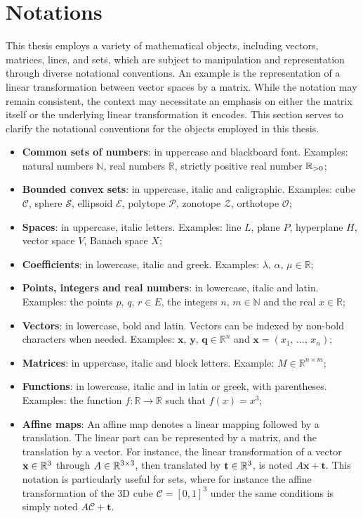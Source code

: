 \section*{Notations}
This thesis employs a variety of mathematical objects, including vectors, matrices, lines, and sets, which are subject to manipulation and representation through diverse notational conventions. An example is the representation of a linear transformation between vector spaces by a matrix. While the notation may remain consistent, the context may necessitate an emphasis on either the matrix itself or the underlying linear transformation it encodes. This section serves to clarify the notational conventions for the objects employed in this thesis.

\begin{itemize}
    \item {\textbf{Common sets of numbers}: in uppercase and blackboard font. Examples: natural numbers $\mathbb{N}$, real numbers $\mathbb{R}$, strictly positive real number $\mathbb{R}_{>0}$;}
    \item {\textbf{Bounded convex sets}: in uppercase, italic and caligraphic. Examples: cube $\mathcal{C}$, sphere $\mathcal{S}$, ellipsoid $\mathcal{E}$, polytope $\mathcal{P}$, zonotope $\mathcal{Z}$, orthotope $\mathcal{O}$;}
    \item{\textbf{Spaces}: in uppercase, italic letters. Examples: line $L$, plane $P$, hyperplane $H$, vector space $V$, Banach space $X$;}
    \item {\textbf{Coefficients}: in lowercase, italic and greek. Examples: $\lambda,\, \alpha,\, \mu \in\mathbb{R}$;}
    \item {\textbf{Points, integers and real numbers}: in lowercase, italic and latin. Examples: the points $p,\, q,\, r \in E$, the integers $n,\,m\in\mathbb{N}$ and the real $x\in \mathbb{R}$;}
    \item {\textbf{Vectors}: in lowercase, bold and latin. Vectors can be indexed by non-bold characters when needed. Examples: $\mathbf{x},\, \mathbf{y},\, \mathbf{q} \in \mathbb{R}^n$ and $\mathbf{x} = (x_1,\, \dots,\, x_n)$;}
    \item {\textbf{Matrices}: in uppercase, italic and block letters. Example: $M \in \mathbb{R}^{n\times m}$;}
    \item {\textbf{Functions}: in lowercase, italic and in latin or greek, with parentheses. Examples: the function $f\colon \mathbb{R}\rightarrow \mathbb{R}$ such that $f(x) = x^3$;}
    \item {\textbf{Affine maps}: An affine map denotes a linear mapping followed by a translation. The linear part can be represented by a matrix, and the translation by a vector. For instance, the linear transformation of a vector $\mathbf{x}\in\mathbb{R}^3$ through $A \in \mathbb{R}^{3\times 3}$, then translated by $\mathbf{t}\in\mathbb{R}^3$, is noted $A\mathbf{x} + \mathbf{t}$. This notation is particularly useful for sets, where for instance the affine transformation of the 3D cube $\mathcal{C}=[0,1]^3$ under the same conditions is simply noted $A\mathcal{C} + \mathbf{t}$.}
\end{itemize}
